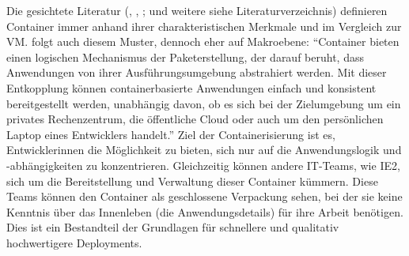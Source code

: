 Die gesichtete Literatur (\cite{pahl_containerization_2015}, \cite{bernstein_containers_2014}, \cite{kharb_automated_2016}; \cite{combe_docker_2016} und weitere siehe Literaturverzeichnis) definieren Container immer anhand ihrer charakteristischen Merkmale und im Vergleich zur \ac{VM}. \cite{google_ireland_limited_container_2020} folgt auch diesem Muster, dennoch eher auf Makroebene: \enquote{Container bieten einen logischen Mechanismus der Paketerstellung, der darauf beruht, dass Anwendungen von ihrer Ausführungsumgebung abstrahiert werden. Mit dieser Entkopplung können containerbasierte Anwendungen einfach und konsistent bereitgestellt werden, unabhängig davon, ob es sich bei der Zielumgebung um ein privates Rechenzentrum, die öffentliche Cloud oder auch um den persönlichen Laptop eines Entwicklers handelt.}\autocite[][]{google_ireland_limited_container_2020} Ziel der Containerisierung ist es, Entwicklerinnen die Möglichkeit zu bieten, sich nur auf die Anwendungslogik und -abhängigkeiten zu konzentrieren. Gleichzeitig können andere IT-Teams, wie \ac{IE2}, sich um die Bereitstellung und Verwaltung dieser Container kümmern. Diese Teams können den Container als geschlossene Verpackung sehen, bei der sie keine Kenntnis über das Innenleben (die Anwendungsdetails) für ihre Arbeit benötigen.\autocite[vgl.][]{google_ireland_limited_container_2020} Dies ist ein Bestandteil der Grundlagen für schnellere und qualitativ hochwertigere Deployments.\autocite[vgl.][S.1]{kharb_automated_2016} \par
